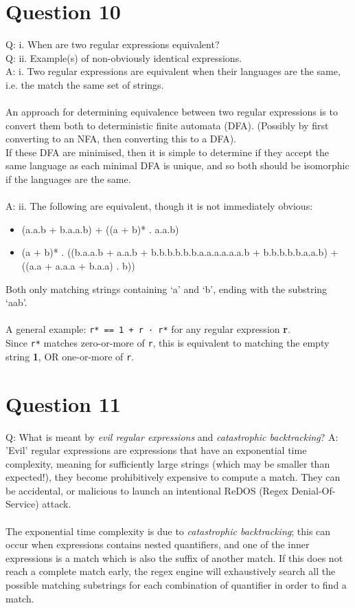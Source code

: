 \documentclass[english]{scrartcl}
\begin{document}
\section*{Question 10}
Q: i. When are two regular expressions equivalent? \\
Q: ii. Example(s) of non-obviously identical expressions.\\
\newline
A: i. Two regular expressions are equivalent when their languages are the same, i.e. the match the same set of strings.\\
\\
An approach for determining equivalence between two regular expressions is to convert them both to deterministic finite automata (DFA).
(Possibly by first converting to an NFA, then converting this to a DFA). \\
If these DFA are minimised, then it is simple to determine if they accept the same language as each minimal DFA is unique, and so both should be isomorphic if the languages are the same. \\
\\
A: ii. The following are equivalent, though it is not immediately obvious:
\begin{itemize}
    \item (a.a.b + b.a.a.b) + ((a + b)* . a.a.b)
    \item (a + b)* . ((b.a.a.b + a.a.b + b.b.b.b.b.b.a.a.a.a.a.a.b + b.b.b.b.b.a.a.b) + ((a.a + a.a.a + b.a.a) . b))
\end{itemize}
Both only matching strings containing `a' and `b', ending with the substring `aab'.
\\ \\
A general example: \verb~r* == 1 + r · r*~ for any regular expression \textbf{r}.
\\
Since \verb~r*~ matches zero-or-more of \verb~r~, this is equivalent to matching the empty string \textbf{1}, OR one-or-more of \verb~r~.


\section*{Question 11}
Q: What is meant by \textit{evil regular expressions} and \textit{catastrophic backtracking}?
\newline
A: 'Evil' regular expressions are expressions that have an exponential time complexity, meaning for sufficiently large strings
(which may be smaller than expected!), they become prohibitively expensive to compute a match.
They can be accidental, or malicious to launch an intentional ReDOS (Regex Denial-Of-Service) attack.
\\
\\
The exponential time complexity is due to \textit{catastrophic backtracking}; this can occur when expressions contains nested quantifiers,
and one of the inner expressions is a match which is also the suffix of another match. If this does not reach a complete match early, the
regex engine will exhaustively search all the possible matching substrings for each combination of quantifier in order to find a match.
\end{document}
